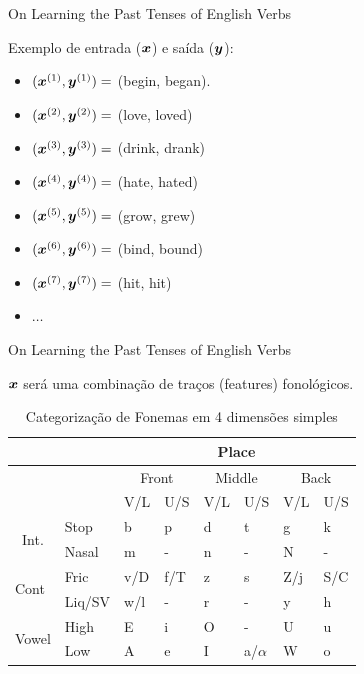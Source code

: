 \documentclass[10pt]{beamer}
\begin{document}
\begin{frame}[fragile]{On Learning the Past Tenses of English Verbs}

Exemplo de entrada ($\bm{x}$) e saída ($\bm{y}$):

\begin{itemize}
\item [] $(\bm{x}^{(1)}, \bm{y}^{(1)}) =$ (begin, began).
\item [] $(\bm{x}^{(2)}, \bm{y}^{(2)}) =$ (love, loved)
\item [] $(\bm{x}^{(3)}, \bm{y}^{(3)}) =$ (drink, drank)
\item [] $(\bm{x}^{(4)}, \bm{y}^{(4)}) =$ (hate, hated)
\item [] $(\bm{x}^{(5)}, \bm{y}^{(5)}) =$ (grow, grew)
\item [] $(\bm{x}^{(6)}, \bm{y}^{(6)}) =$ (bind, bound)
\item [] $(\bm{x}^{(7)}, \bm{y}^{(7)}) =$ (hit, hit)
\item [] $\dots$
\end{itemize}
\end{frame}


\begin{frame}[fragile]{On Learning the Past Tenses of English Verbs}

$\bm{x}$ será uma combinação de traços (features) fonológicos.

\begin{table}[]
\centering
\caption{Categorização de Fonemas em 4 dimensões simples}
\label{fontable}
\begin{tabular}{llllllll}
\hline
 &  & \multicolumn{6}{c}{Place} \\ \hline
 &  & \multicolumn{2}{c|}{Front} & \multicolumn{2}{c|}{Middle} & \multicolumn{2}{c}{Back} \\ \hline
 &  & \multicolumn{1}{l|}{V/L} & \multicolumn{1}{l|}{U/S} & \multicolumn{1}{l|}{V/L} & \multicolumn{1}{l|}{U/S} & \multicolumn{1}{l|}{V/L} & U/S \\ \hline
 \multicolumn{1}{c}{\multirow{2}{*}{Int.}} & Stop & b & p & d & t & g & k \\ \cline{2-8} 
\multicolumn{1}{c}{} & Nasal & m & - & n & - & N & - \\ \hline
\multirow{2}{*}{Cont} & Fric & v/D & f/T & z & s & Z/j & S/C \\ \cline{2-8} 
 & Liq/SV & w/l & - & r & - & y & h \\ \hline
 \multirow{2}{*}{Vowel} & High & E & i & O & - & U & u \\ \cline{2-8} 
 & Low & A & e & I & a/$\alpha$ & W & o \\ \hline
\end{tabular}
\end{table}

\end{frame}
\end{document}
